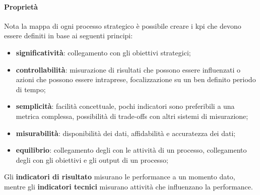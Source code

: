 \paragraph{Proprietà}\label{par:kpi_proprieta} %
Nota la mappa di ogni processo strategico è possibile creare i \ac{kpi} che devono essere definiti in base ai seguenti principi:
\begin{itemize}
    \item \textbf{significatività}: collegamento con gli obiettivi strategici;
    \item \textbf{controllabilità}: misurazione di risultati che possono essere influenzati o azioni che possono essere intraprese, focalizzazione su un ben definito periodo di tempo;
    \item \textbf{semplicità}: facilità concettuale, pochi indicatori sono preferibili a una metrica complessa, possibilità di trade-offs con altri sistemi di misurazione;
    \item \textbf{misurabilità}: disponibilità dei dati, affidabilità e accuratezza dei dati;
    \item \textbf{equilibrio}: collegamento degli  con le attività di un processo, collegamento degli  con gli obiettivi e gli output di un processo;
\end{itemize}
\begin{note}
    Gli \textbf{indicatori di risultato} misurano le performance a un momento dato, mentre gli \textbf{indicatori tecnici} misurano attività che influenzano la performance.
\end{note}
%

